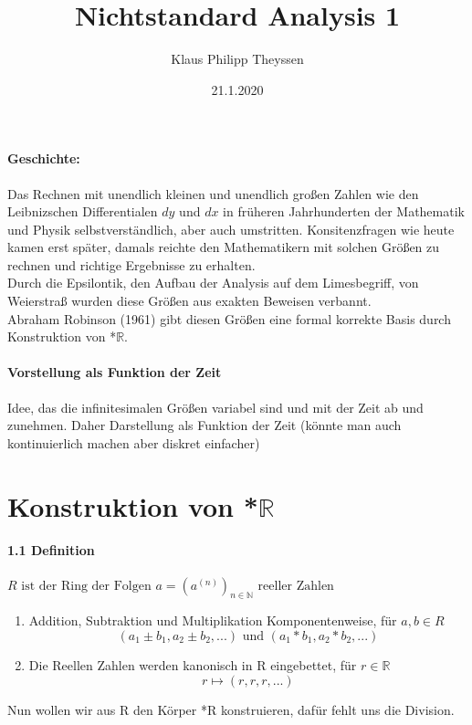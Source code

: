 \documentclass[a4paper]{article}
\title{Nichtstandard Analysis 1}
\date{21.1.2020}
\author{Klaus Philipp Theyssen}
\begin{document}


\paragraph{Geschichte:}  
Das Rechnen mit unendlich kleinen und unendlich großen Zahlen wie den Leibnizschen Differentialen
$ dy $ und $ dx $ in früheren Jahrhunderten der Mathematik und Physik selbstverständlich, 
aber auch umstritten. Konsitenzfragen wie heute kamen erst später, damals reichte den Mathematikern
mit solchen Größen zu rechnen und richtige Ergebnisse zu erhalten. \\
Durch die Epsilontik, den Aufbau der Analysis auf dem Limesbegriff, von Weierstraß wurden diese Größen aus 
exakten Beweisen verbannt. \\ 
Abraham Robinson (1961) gibt diesen Größen eine formal korrekte Basis durch Konstruktion von *$\mathbb{R}$.

\paragraph{Vorstellung als Funktion der Zeit} Idee, das die infinitesimalen Größen variabel sind und mit der Zeit ab und zunehmen.
Daher Darstellung als Funktion der Zeit (könnte man auch kontinuierlich machen aber diskret einfacher)

\section{Konstruktion von *$\mathbb{R}$}
\paragraph{1.1 Definition} $ R \text{ ist der Ring der Folgen }  a = (a^{(n)})_{n \in \mathbb{N}} \text{ reeller Zahlen} $
\begin{enumerate}
      \item Addition, Subtraktion und Multiplikation Komponentenweise, für $a, b \in R$  
            $$ (a_1 \pm b_1, a_2 \pm b_2,...) \text{ und } (a_1 * b_1, a_2 * b_2,...) $$ 
      \item Die Reellen Zahlen werden kanonisch in R eingebettet, für $ r \in \mathbb{R} $ 
            $$ r \mapsto (r,r,r,...) $$
\end{enumerate}
\smallskip
Nun wollen wir aus R den Körper *R konstruieren, dafür fehlt uns die Division. \\
\end{document}
